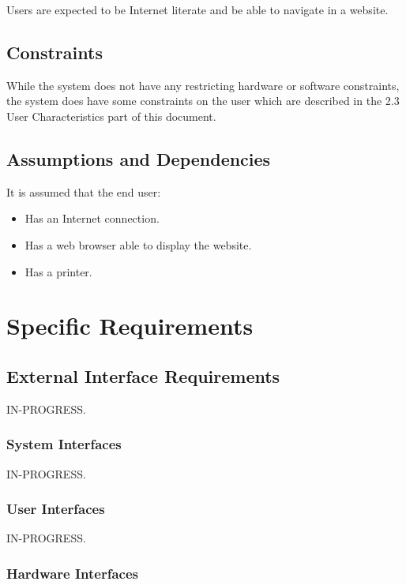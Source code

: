 \documentclass{scrreprt}
\begin{document}
Users are expected to be Internet literate and be able to navigate in a
website.

\section{Constraints}

While the system does not have any restricting hardware or software
constraints, the system does have some constraints on the user which are
described in the 2.3 User Characteristics part of this document.

\section{Assumptions and Dependencies}

It is assumed that the end user: 

\begin{itemize}
\item Has an Internet connection. 
\item Has a web browser able to display the website.
\item Has a printer.
\end{itemize}

\chapter{Specific Requirements}

\section{External Interface Requirements}

IN-PROGRESS.

\subsection{System Interfaces}

IN-PROGRESS.

\subsection{User Interfaces}

IN-PROGRESS.

\subsection{Hardware Interfaces}
\end{document}
